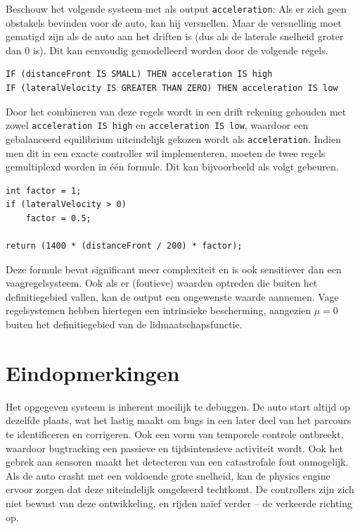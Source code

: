 \documentclass[10pt,a4paper]{article}
\begin{document}
			Beschouw het volgende systeem met als output \texttt{acceleration}: Als er zich geen obstakels bevinden voor de auto, kan hij versnellen. Maar de versnelling moet gematigd zijn als de auto aan het driften is (dus als de laterale snelheid groter dan 0 is).
			Dit kan eenvoudig gemodelleerd worden door de volgende regels.

			\begin{lstlisting}
IF (distanceFront IS SMALL) THEN acceleration IS high
IF (lateralVelocity IS GREATER THAN ZERO) THEN acceleration IS low
			\end{lstlisting}

			Door het combineren van deze regels wordt in een drift rekening gehouden met zowel \texttt{acceleration IS high} en \texttt{acceleration IS low}, waardoor een gebalanceerd equilibrium uiteindelijk gekozen wordt als \texttt{acceleration}.
			Indien men dit in een exacte controller wil implementeren, moeten de twee regels gemultiplexd worden in \'e\'en formule. Dit kan bijvoorbeeld als volgt gebeuren.

			\begin{lstlisting}
int factor = 1;
if (lateralVelocity > 0)
	factor = 0.5;

return (1400 * (distanceFront / 200) * factor);
			\end{lstlisting}

			Deze formule bevat significant meer complexiteit en is ook sensitiever dan een vaagregelsysteem. Ook als er (foutieve) waarden optreden die buiten het definitiegebied vallen, kan de output een ongewenste waarde aannemen. Vage regelsystemen hebben hiertegen een intrinsieke bescherming, aangezien $\mu = 0$ buiten het definitiegebied van de lidmaatschapsfunctie.

		\section*{Eindopmerkingen}
			Het opgegeven systeem is inherent moeilijk te debuggen. De auto start altijd op dezelfde plaats, wat het lastig maakt om bugs in een later deel van het parcours te identificeren en corrigeren. Ook een vorm van temporele controle ontbreekt, waardoor bugtracking een passieve en tijdsintensieve activiteit wordt. Ook het gebrek aan sensoren maakt het detecteren van een catastrofale fout onmogelijk. Als de auto crasht met een voldoende grote snelheid, kan de physics engine ervoor zorgen dat deze uiteindelijk omgekeerd techtkomt. De controllers zijn zich niet bewust van deze ontwikkeling, en rijden na\"ief verder -- de verkeerde richting op.\\
\end{document}
